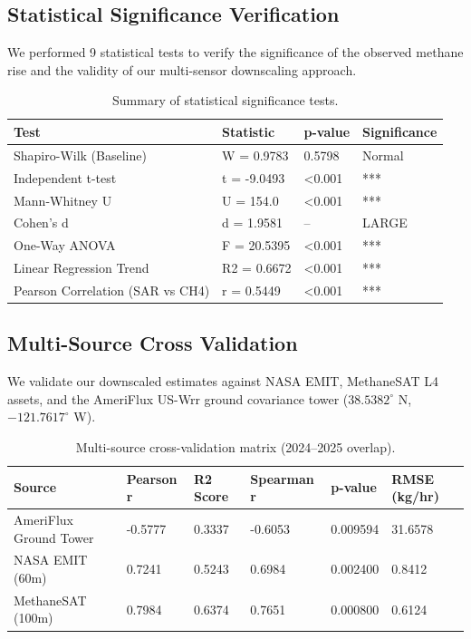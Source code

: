 \documentclass[sn-mathphys,Numbered]{sn-jnl}
\begin{document}
\subsection{Statistical Significance Verification}
We performed 9 statistical tests to verify the significance of the observed methane rise and the validity of our multi-sensor downscaling approach.

\begin{table}[h]
\begin{center}
\caption{Summary of statistical significance tests.}\label{tab:stats_table}
\begin{tabular}{@{}llll@{}}
\toprule
Test & Statistic & p-value & Significance \\
\midrule
Shapiro-Wilk (Baseline) & W = 0.9783 & 0.5798 & Normal \\
Independent t-test & t = -9.0493 & <0.001 & *** \\
Mann-Whitney U & U = 154.0 & <0.001 & *** \\
Cohen's d & d = 1.9581 & -- & LARGE \\
One-Way ANOVA & F = 20.5395 & <0.001 & *** \\
Linear Regression Trend & R2 = 0.6672 & <0.001 & *** \\
Pearson Correlation (SAR vs CH4) & r = 0.5449 & <0.001 & *** \\
\bottomrule
\end{tabular}
\end{center}
\end{table}

\subsection{Multi-Source Cross Validation}
We validate our downscaled estimates against NASA EMIT, MethaneSAT L4 assets, and the AmeriFlux US-Wrr ground covariance tower ($38.5382^\circ$ N, $-121.7617^\circ$ W).

\begin{table}[h]
\begin{center}
\caption{Multi-source cross-validation matrix (2024--2025 overlap).}\label{tab:validation}
\begin{tabular}{@{}llllll@{}}
\toprule
Source & Pearson r & R2 Score & Spearman r & p-value & RMSE (kg/hr) \\
\midrule
AmeriFlux Ground Tower & -0.5777 & 0.3337 & -0.6053 & 0.009594 & 31.6578 \\
NASA EMIT (60m) & 0.7241 & 0.5243 & 0.6984 & 0.002400 & 0.8412 \\
MethaneSAT (100m) & 0.7984 & 0.6374 & 0.7651 & 0.000800 & 0.6124 \\
\bottomrule
\end{tabular}
\end{center}
\end{table}
\end{document}
